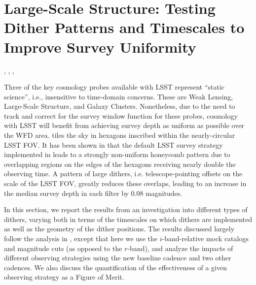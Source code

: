 %
%
%
\newcommand{\sigmaOS}[0]{$\sigma_{\mathrm{C_{\ell, {OS}}}}$}
\newcommand{\CellOS}[0]{$C_{\ell, \rm{OS}}$}
\newcommand{\statFloor}[0]{$\Delta C_\ell$}
\newcommand{\delobs}[0]{\delta_{\mathrm{obs},i}}
\newcommand{\dellss}[0]{\delta_{\mathrm{LSS},i}}
\newcommand{\delos}[0]{\delta_{\mathrm{OS},i}}
\newcommand{\ev}[1]{\left < {#1} \right >}

\section{Large-Scale Structure: Testing Dither Patterns and Timescales to Improve Survey Uniformity}
\def\secname{lss}\label{sec:\secname}

,
,
,

Three of the key cosmology probes available with LSST represent ``static science'', i.e., insensitive to time-domain concerns.  These are Weak Lensing, Large-Scale Structure, and Galaxy Clusters.  Nonetheless, due to the need to track and correct for the survey window function for these probes, cosmology with LSST will benefit from achieving survey depth as uniform as possible over the WFD area.  \OpSim tiles the sky in hexagons inscribed within the nearly-circular LSST FOV. It has been shown in \citet{CarrollEtal2014} that the default LSST survey strategy implemented in \OpSim leads to a strongly non-uniform honeycomb pattern due to overlapping regions on the edges of the hexagons receiving nearly double the observing time.  A pattern of large dithers, i.e. telescope-pointing offsets on the scale of the LSST FOV, greatly reduces these overlaps, leading to an increase in the median survey depth in each filter by 0.08 magnitudes.

In this section, we report the results from an investigation into different types of dithers, varying both in terms of the timescales on which dithers are implemented as well as the geometry of the dither positions. The results discussed largely follow the analysis in \citet{AwanEtal2016}, except that here we use the $i$-band-relative mock catalogs and magnitude cuts (as opposed to the $r$-band), and analyze the impacts of different observing strategies using the new baseline cadence  and two other cadences. We also discuss the quantification of the effectiveness of a given observing strategy as a Figure of Merit.

